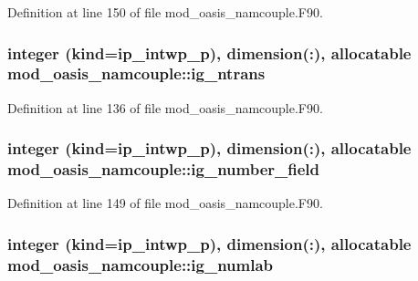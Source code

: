 Definition at line 150 of file mod\+\_\+oasis\+\_\+namcouple.\+F90.

\hypertarget{classmod__oasis__namcouple_ac4549f9f5bbb37fce3edc9a208e0d48b}{
\subsubsection[{ig\+\_\+ntrans}]{\setlength{\rightskip}{0pt plus 5cm}integer (kind=ip\+\_\+intwp\+\_\+p), dimension(\+:), allocatable mod\+\_\+oasis\+\_\+namcouple\+::ig\+\_\+ntrans\hspace{0.3cm}{\ttfamily [private]}}}\label{classmod__oasis__namcouple_ac4549f9f5bbb37fce3edc9a208e0d48b}


Definition at line 136 of file mod\+\_\+oasis\+\_\+namcouple.\+F90.

\hypertarget{classmod__oasis__namcouple_a0751f74f7ce6520d8e860b9da14d1d9d}{
\subsubsection[{ig\+\_\+number\+\_\+field}]{\setlength{\rightskip}{0pt plus 5cm}integer (kind=ip\+\_\+intwp\+\_\+p), dimension(\+:), allocatable mod\+\_\+oasis\+\_\+namcouple\+::ig\+\_\+number\+\_\+field\hspace{0.3cm}{\ttfamily [private]}}}\label{classmod__oasis__namcouple_a0751f74f7ce6520d8e860b9da14d1d9d}


Definition at line 149 of file mod\+\_\+oasis\+\_\+namcouple.\+F90.

\hypertarget{classmod__oasis__namcouple_ab0b9a7822ec44010e8652ed2d6abc0db}{
\subsubsection[{ig\+\_\+numlab}]{\setlength{\rightskip}{0pt plus 5cm}integer (kind=ip\+\_\+intwp\+\_\+p), dimension(\+:), allocatable mod\+\_\+oasis\+\_\+namcouple\+::ig\+\_\+numlab\hspace{0.3cm}{\ttfamily [private]}}}\label{classmod__oasis__namcouple_ab0b9a7822ec44010e8652ed2d6abc0db}


